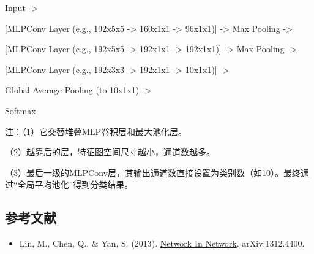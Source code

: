 Input -\textgreater{}

{[}MLPConv Layer (e.g., 192x5x5 -\textgreater{} 160x1x1 -\textgreater{} 96x1x1){]} -\textgreater{} Max Pooling -\textgreater{}

{[}MLPConv Layer (e.g., 192x5x5 -\textgreater{} 192x1x1 -\textgreater{} 192x1x1){]} -\textgreater{} Max Pooling -\textgreater{}

{[}MLPConv Layer (e.g., 192x3x3 -\textgreater{} 192x1x1 -\textgreater{} 10x1x1){]} -\textgreater{}

Global Average Pooling (to 10x1x1) -\textgreater{}

Softmax

注：（1）它交替堆叠MLP卷积层和最大池化层。

（2）越靠后的层，特征图空间尺寸越小，通道数越多。

（3）最后一级的MLPConv层，其输出通道数直接设置为类别数（如10）。最终通过``全局平均池化''得到分类结果。

\FloatBarrier
{}
\hypertarget{ux53c2ux8003ux6587ux732e-12}{%
\subsection{参考文献}\label{ux53c2ux8003ux6587ux732e-12}}

\vspace{0.25em}
\begin{itemize}
\tightlist
\item
  Lin, M., Chen, Q., \& Yan, S. (2013). \href{https://arxiv.org/abs/1312.4400}{Network In Network}. arXiv:1312.4400.
\end{itemize}

\clearpage
